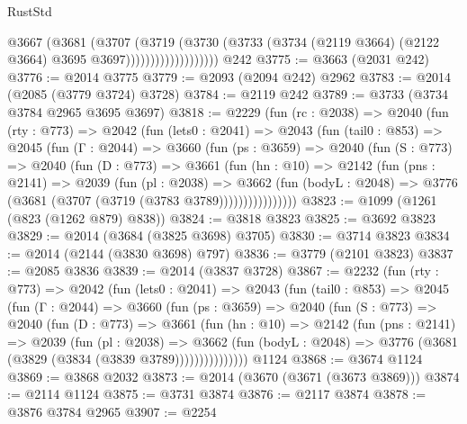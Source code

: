 \begin{lexlean}{RustStd}
\begin{coremodule}
                            @3667
                              (@3681
                                (@3707
                                  (@3719
                                    (@3730
                                      (@3733
                                        (@3734
                                          (@2119 @3664)
                                          (@2122 @3664)
                                          @3695
                                          @3697)))))))))))))))))))
    @242
@3775 := @3663 (@2031 @242)
@3776 := @2014 @3775
@3779 := @2093 (@2094 @242) @2962
@3783 := @2014 (@2085 (@3779 @3724) @3728)
@3784 := @2119 @242
@3789 := @3733 (@3734 @3784 @2965 @3695 @3697)
@3818 := @2229
    (fun (rc : @2038) =>
    @2040
      (fun (rty : @773) =>
      @2042
        (fun (lets0 : @2041) =>
        @2043
          (fun (tail0 : @853) =>
          @2045
            (fun (Γ : @2044) =>
            @3660
              (fun (ps : @3659) =>
              @2040
                (fun (S : @773) =>
                @2040
                  (fun (D : @773) =>
                  @3661
                    (fun (hn : @10) =>
                    @2142
                      (fun (pns : @2141) =>
                      @2039
                        (fun (pl : @2038) =>
                        @3662
                          (fun (bodyL : @2048) =>
                          @3776 (@3681 (@3707 (@3719 (@3783 @3789))))))))))))))))
@3823 := @1099 (@1261 (@823 (@1262 @879) @838))
@3824 := @3818 @3823
@3825 := @3692 @3823
@3829 := @2014 (@3684 (@3825 @3698) @3705)
@3830 := @3714 @3823
@3834 := @2014 (@2144 (@3830 @3698) @797)
@3836 := @3779 (@2101 @3823)
@3837 := @2085 @3836
@3839 := @2014 (@3837 @3728)
@3867 := @2232
    (fun (rty : @773) =>
    @2042
      (fun (lets0 : @2041) =>
      @2043
        (fun (tail0 : @853) =>
        @2045
          (fun (Γ : @2044) =>
          @3660
            (fun (ps : @3659) =>
            @2040
              (fun (S : @773) =>
              @2040
                (fun (D : @773) =>
                @3661
                  (fun (hn : @10) =>
                  @2142
                    (fun (pns : @2141) =>
                    @2039
                      (fun (pl : @2038) =>
                      @3662
                        (fun (bodyL : @2048) =>
                        @3776 (@3681 (@3829 (@3834 (@3839 @3789)))))))))))))))
    @1124
@3868 := @3674 @1124
@3869 := @3868 @2032
@3873 := @2014 (@3670 (@3671 (@3673 @3869)))
@3874 := @2114 @1124
@3875 := @3731 @3874
@3876 := @2117 @3874
@3878 := @3876 @3784 @2965
@3907 := @2254

\end{coremodule}
\end{lexlean}
